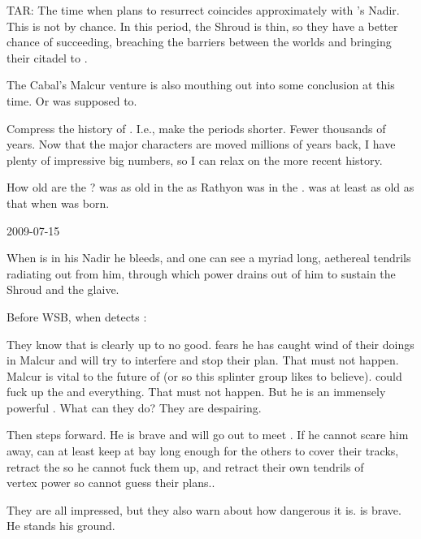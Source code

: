 TAR: 
The time when \Secherdamon plans to resurrect \Nithdornazsh coincides approximately with \Ishnaruchaefir's Nadir.
This is not by chance. 
In this period, the Shroud is thin, so they have a better chance of succeeding, breaching the barriers between the worlds and bringing their citadel to \Azmith. 

The Cabal's Malcur venture is also mouthing out into some conclusion at this time. 
Or was supposed to. 



Compress the history of \Miith.
I.e., make the periods shorter. 
Fewer thousands of years. 
Now that the \draconic major characters are moved millions of years back, I have plenty of impressive big numbers, so I can relax on the more recent history. 

How old are the \dragons?
\Nzessuacrith was as old in the \secondbanewar as Rathyon was in the \thirdbanewar.
\Ishnaruchaefir was at least as old as that when \Nzessuacrith was born. 



2009-07-15

When \Ishnaruchaefir is in his Nadir he bleeds, and one can see a myriad long, aethereal tendrils radiating out from him, through which power drains out of him to sustain the Shroud and the glaive. 

Before WSB, when \Achsah detects \Ishnaruchaefir:

  They know that \Ishnaruchaefir is clearly up to no good.
  \Urizeth fears he has caught wind of their doings in Malcur and will try to interfere and stop their plan.
  That must not happen. 
  Malcur is vital to the future of \CiriathSepher (or so this splinter group likes to believe). 
  \Ishnaruchaefir could fuck up the \noggyaleth and everything. 
  That must not happen. 
  But he is an immensely powerful \shaeeroth \dragon.
  What can they do?
  They are despairing.
  
  Then \Teshrial steps forward. 
  He is brave and will go out to meet \Ishnaruchaefir. 
  If he cannot scare him away, \Teshrial can at least keep \Ishnaruchaefir at bay long enough for the others to cover their tracks, retract the \noggyaleth so he cannot fuck them up, and retract their own tendrils of \\vertex power so \Ishnaruchaefir cannot guess their plans..
  
  They are all impressed, but they also warn \Teshrial about how dangerous it is.
  \Teshrial is brave. 
  He stands his ground. 
  
